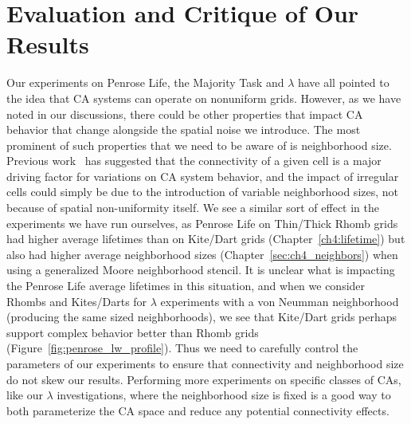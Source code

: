 \documentclass[a4paper,11pt,twoside]{report}
\begin{document}
\section{Evaluation and Critique of Our Results}

Our experiments on Penrose Life, the Majority Task and $\lambda$ have all pointed to the idea that CA systems can operate on nonuniform grids. However, as we have noted in our discussions, there could be other properties that impact CA behavior that change alongside the spatial noise we introduce. The most prominent of such properties that we need to be aware of is neighborhood size. Previous work~\cite{fl01} has suggested that the connectivity of a given cell is a major driving factor for variations on CA system behavior, and the impact of irregular cells could simply be due to the introduction of variable neighborhood sizes, not because of spatial non-uniformity itself. We see a similar sort of effect in the experiments we have run ourselves, as Penrose Life on Thin/Thick Rhomb grids had higher average lifetimes than on Kite/Dart grids (Chapter~\ref{ch4:lifetime}) but also had higher average neighborhood sizes (Chapter~\ref{sec:ch4_neighbors}) when using a generalized Moore neighborhood stencil. It is unclear what is impacting the Penrose Life average lifetimes in this situation, and when we consider Rhombs and Kites/Darts for $\lambda$ experiments with a von Neumman neighborhood (producing the same sized neighborhoods), we see that Kite/Dart grids perhaps support complex behavior better than Rhomb grids (Figure~\ref{fig:penrose_lw_profile}). Thus we need to carefully control the parameters of our experiments to ensure that connectivity and neighborhood size do not skew our results. Performing more experiments on specific classes of CAs, like our $\lambda$ investigations, where the neighborhood size is fixed is a good way to both parameterize the CA space and reduce any potential connectivity effects.
\end{document}
